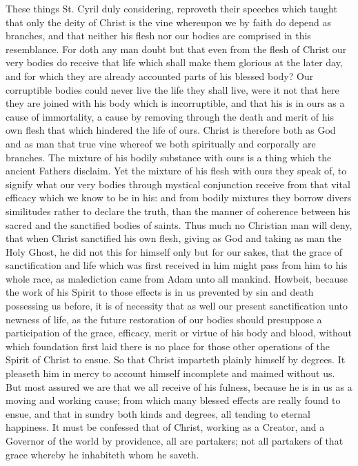 These things St. Cyril duly considering, reproveth their speeches which taught that only the deity of Christ is the vine whereupon we by faith do depend as branches, and that neither his flesh nor our bodies are comprised in this resemblance. For doth any man doubt but that even from the flesh of Christ our very bodies do receive that life which shall make them glorious at the later day, and  for which they are already accounted parts of his blessed body? Our corruptible bodies could never live the life they shall live, were it not that here they are joined with his body which is incorruptible, and that his is in ours as a cause of immortality, a cause by removing through the death and merit of his own flesh that which hindered the life of ours. Christ is therefore both as God and as man that true vine whereof we both spiritually and corporally are branches. The mixture of his bodily substance with ours is a thing which the ancient Fathers disclaim. Yet the mixture of his flesh with ours they speak of, to signify what our very bodies through mystical conjunction receive from that vital efficacy which we know to be in his: and from bodily mixtures they borrow divers similitudes rather to declare the truth, than the manner of coherence between his sacred and the sanctified bodies of saints.
Thus much no Christian man will deny, that when Christ sanctified his own flesh, giving as God and taking as man the Holy Ghost, he did not this for himself only but for our sakes, that the grace of sanctification and life which was first received in him might pass from him to his whole race, as malediction came from Adam unto all mankind. Howbeit, because the work of his Spirit to those effects is in us prevented by sin and death possessing us before, it is of necessity that as well our present sanctification unto newness of life, as the future restoration of our bodies should presuppose a participation of the grace, efficacy, merit or virtue of  his body and blood, without which foundation first laid there is no place for those other operations of the Spirit of Christ to ensue. So that Christ imparteth plainly himself by degrees.
It pleaseth him in mercy to account himself incomplete and maimed without us. But most assured we are that we all receive of his fulness, because he is in us as a moving and working cause; from which many blessed effects are really found to ensue, and that in sundry both kinds and degrees, all tending to eternal happiness. It must be confessed that of Christ, working as a Creator, and a Governor of the world by providence, all are partakers; not all partakers of that grace whereby he inhabiteth whom he saveth.
